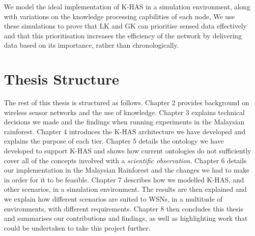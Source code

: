 We model the ideal implementation of K-HAS in a simulation environment, along with variations on the knowledge processing capbilities of each node, We use these simulations to prove that LK and GK can prioritise sensed data effectively and that this prioritisation increases the efficiency of the network by delivering data based on its importance, rather than chronologically.


\section{Thesis Structure}
The rest of this thesis is structured as follows. Chapter 2 provides background on wireless sensor networks and the use of knowledge. Chapter 3 explains technical decisions we made and the findings when running experiments in the Malaysian rainforest. Chapter 4 introduces the K-HAS architecture we have developed and explains the purpose of each tier. Chapter 5 details the ontology we have developed to support K-HAS and shows how current ontologies do not sufficiently cover all of the concepts involved with a \textit{scientific observation}. Chapter 6 details our implementation in the Malaysian Rainforest and the changes we had to make in order for it to be feasible. Chapter 7 describes how we modelled K-HAS, and other scenarios, in a simulation environment. The results are then explained and we explain how different scenarios are suited to WSNs, in a multitude of environments, with different requirements. Chapter 8 then concludes this thesis and summarises our contributions and findings, as well as highlighting work that could be undertaken to take this project further.